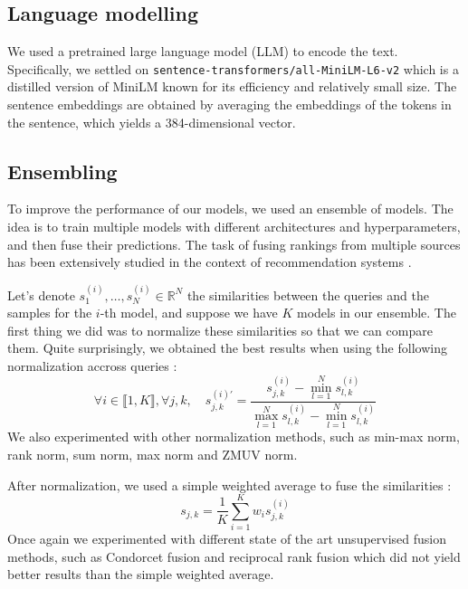 \documentclass[switch, 11pt]{article}
\newcommand{\R}{\mathbb{R}}
\begin{document}
\begin{multicols}{2}
    \subsection{Language modelling}

    We used a pretrained large language model (LLM) to encode the text. Specifically, we settled on \texttt{sentence-transformers/all-MiniLM-L6-v2} which is a distilled version of MiniLM \cite{wang-2020} known for its efficiency and relatively small size. The sentence embeddings are obtained by averaging the embeddings of the tokens in the sentence, which yields a 384-dimensional vector.

    \subsection{Ensembling}

    To improve the performance of our models, we used an ensemble of models. The idea is to train multiple models with different architectures and hyperparameters, and then fuse their predictions. The task of fusing rankings from multiple sources has been extensively studied in the context of recommendation systems \cite{bachanowski-2023}.

    Let's denote $s_1^{(i)}, \dots, s_N^{(i)}\in\R^N$ the similarities between the queries and the samples for the $i$-th model, and suppose we have $K$ models in our ensemble. The first thing we did was to normalize these similarities so that we can compare them. Quite surprisingly, we obtained the best results when using the following normalization accross queries :
    \begin{equation}
        \forall i\in \llbracket1, K\rrbracket, \forall j,k, \quad s_{j,k}^{(i)'} = \frac{s_{j,k}^{(i)} - \min_{l=1}^N s_{l,k}^{(i)}}{\max_{l=1}^N s_{l,k}^{(i)} - \min_{l=1}^N s_{l,k}^{(i)}}
    \end{equation}
    We also experimented with other normalization methods, such as min-max norm, rank norm, sum norm, max norm and ZMUV norm.

    After normalization, we used a simple weighted average to fuse the similarities :
    \begin{equation}
        s_{j,k} = \frac{1}{K}\sum_{i=1}^K w_i s_{j,k}^{(i)}
    \end{equation}
    Once again we experimented with different state of the art unsupervised fusion methods, such as Condorcet fusion \cite{montague-2002} and reciprocal rank fusion \cite{cormack-2009} which did not yield better results than the simple weighted average.


\end{multicols}
\end{document}
